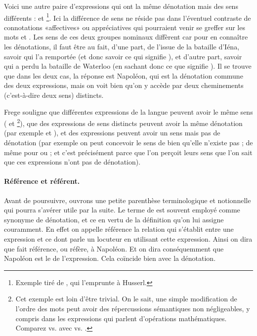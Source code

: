 Voici une autre paire d'expressions qui ont la même dénotation mais
des sens différents :  et 
\footnote{Exemple tiré de
  \citet{Lyons:77Fr}, qui
l'emprunte à Husserl.}.  Ici la différence de sens ne réside pas dans
l'éventuel contraste de connotations «affectives» ou appréciatives
qui pourraient venir se greffer sur les mots  et
.  Les sens de ces deux groupes nominaux diffèrent car
pour en connaître les dénotations, il faut être au fait, d'une part, de
l'issue de la bataille d'Iéna, savoir qui l'a remportée (et donc
savoir ce qui signifie ), et d'autre
part, savoir qui a perdu la bataille de Waterloo (en sachant donc ce que
signifie ).  Il se trouve que
dans les deux cas, la réponse est Napoléon, qui est la dénotation
commune des deux expressions, mais on voit bien qu'on y  accède par
deux cheminements (c'est-à-dire deux sens) distincts.

Frege souligne que différentes expressions de la langue peuvent avoir le
même sens ( et \footnote{Cet exemple est loin d'être trivial. On le sait, une simple
  modification de l'ordre des mots peut avoir des répercussions
  sémantiques non négligeables, y compris dans les expressions qui
  parlent d'opérations mathématiques.  Comparez  vs.  avec  vs. .}), que 
des expressions de sens distincts peuvent avoir la même dénotation
(par exemple  et ),
et des expressions peuvent avoir un sens mais pas de dénotation (par
exemple on peut concevoir le sens de  bien qu'elle n'existe pas ; de même pour  ou  ; et c'est
précisément parce que l'on perçoit leurs sens que l'on sait que ces
expressions n'ont pas de dénotation).


\largerpage[-1]

\paragraph*{Référence et référent.}
Avant de poursuivre, ouvrons une petite parenthèse terminologique et
notionnelle qui pourra s'avérer utile par la suite.  Le terme de
 est souvent employé comme synonyme de
dénotation, et ce en vertu de la définition qu'on lui assigne
couramment.  En effet on appelle référence la relation qui s'établit
entre une expression et ce dont parle un locuteur en utilisant cette
expression.  Ainsi on dira que  fait
référence, ou réfère, à Napoléon.  Et on dira conséquemment que Napoléon
est le  de l'expression.  Cela coïncide bien
avec la dénotation.  

